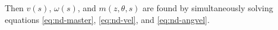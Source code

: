 \documentclass{article}
\newcommand{\dd}{d}
\newcommand{\Pder}[2]{\frac{\partial #1}{\partial #2}}
\newcommand{\Int}[4]{\int_{#3}^{#4} #1 \, \dd #2}
\begin{document}
Then $v(s)$, $\omega(s)$, and $m(z, \theta, s)$ are found by
simultaneously solving equations \eqref{eq:nd-master},
\eqref{eq:nd-vel}, and \eqref{eq:nd-angvel}.



\end{document}
